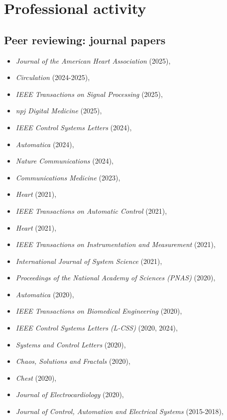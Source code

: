\documentclass[10pt,A4]{article} %
\begin{document}
\section{Professional activity}

\subsection{Peer reviewing: journal papers}

\begin{itemize}
 \item {\em Journal of the American Heart Association } (2025),  \item {\em Circulation } (2024-2025),  \item {\em IEEE Transactions on Signal Processing } (2025),  \item {\em npj Digital Medicine } (2025),  \item {\em IEEE Control Systems Letters } (2024),  \item {\em Automatica } (2024),  \item {\em Nature Communications } (2024),  \item {\em Communications Medicine } (2023),  \item {\em Heart } (2021),  \item {\em IEEE Transactions on Automatic Control } (2021),  \item {\em Heart } (2021),  \item {\em IEEE Transactions on Instrumentation and Measurement } (2021),  \item {\em International Journal of System Science } (2021),  \item {\em Proceedings of the National Academy of Sciences (PNAS) } (2020),  \item {\em Automatica } (2020),  \item {\em IEEE Transactions on Biomedical Engineering } (2020),  \item {\em IEEE Control Systems Letters (L-CSS) } (2020, 2024),  \item {\em Systems and Control Letters } (2020),  \item {\em Chaos, Solutions and Fractals } (2020),  \item {\em Chest } (2020),  \item {\em Journal of Electrocardiology } (2020),  \item {\em Journal of Control, Automation and Electrical Systems } (2015-2018), 
\end{itemize}
\end{document}
